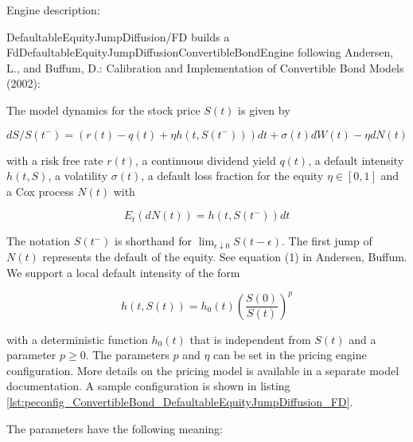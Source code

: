 Engine description:

DefaultableEquityJumpDiffusion/FD builds a FdDefaultableEquityJumpDiffusionConvertibleBondEngine following Andersen, L.,
and Buffum, D.: Calibration and Implementation of Convertible Bond Models (2002):

The model dynamics for the stock price $S(t)$ is given by

\begin{equation}
  dS / S(t^-) = (r(t) - q(t) + \eta h(t, S(t^-))) dt + \sigma(t) dW(t) - \eta dN(t)
\end{equation}

with a risk free rate $r(t)$, a continuous dividend yield $q(t)$, a default intensity $h(t,S)$, a volatility
$\sigma(t)$, a default loss fraction for the equity $\eta \in [0,1]$ and a Cox process $N(t)$ with

\begin{equation}
  E_t(dN(t)) = h(t,S(t^-)) dt
\end{equation}

The notation $S(t^-)$ is shorthand for $\lim_{\epsilon\downarrow 0} S(t-\epsilon)$. The first jump of $N(t)$ represents
the default of the equity. See equation (1) in Andersen, Buffum. We support a local default intensity of the form

\begin{equation}
h(t,S(t)) = h_0(t) \left( \frac{S(0)}{S(t)} \right)^p
\end{equation}

with a deterministic function $h_0(t)$ that is independent from $S(t)$ and a parameter $p \geq 0$. The parameters $p$
and $\eta$ can be set in the pricing engine configuration. More details on the pricing model is available in a separate
model documentation. A sample configuration is shown in listing
\ref{lst:peconfig_ConvertibleBond_DefaultableEquityJumpDiffusion_FD}.

The parameters have the following meaning:

